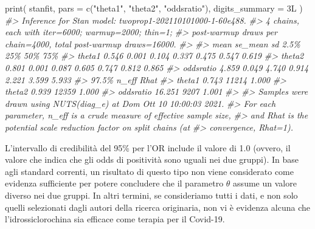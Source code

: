 \documentclass[
]{memoir}
\newenvironment{Shaded}{\begin{snugshade}}{\end{snugshade}}
\newcommand{\AttributeTok}[1]{\textcolor[rgb]{0.77,0.63,0.00}{#1}}
\newcommand{\CommentTok}[1]{\textcolor[rgb]{0.56,0.35,0.01}{\textit{#1}}}
\newcommand{\FunctionTok}[1]{\textcolor[rgb]{0.00,0.00,0.00}{#1}}
\newcommand{\NormalTok}[1]{#1}
\newcommand{\OtherTok}[1]{\textcolor[rgb]{0.56,0.35,0.01}{#1}}
\newcommand{\SpecialCharTok}[1]{\textcolor[rgb]{0.00,0.00,0.00}{#1}}
\newcommand{\StringTok}[1]{\textcolor[rgb]{0.31,0.60,0.02}{#1}}
\begin{document}
\begin{Shaded}
\end{Shaded}

\begin{Shaded}
\begin{Highlighting}[]
\FunctionTok{print}\NormalTok{(}
\NormalTok{  stanfit,}
  \AttributeTok{pars =} \FunctionTok{c}\NormalTok{(}\StringTok{"theta1"}\NormalTok{, }\StringTok{"theta2"}\NormalTok{, }\StringTok{"oddsratio"}\NormalTok{),}
  \AttributeTok{digits\_summary =}\NormalTok{ 3L}
\NormalTok{)}
\CommentTok{\#\textgreater{} Inference for Stan model: twoprop1{-}202110101000{-}1{-}60e488.}
\CommentTok{\#\textgreater{} 4 chains, each with iter=6000; warmup=2000; thin=1; }
\CommentTok{\#\textgreater{} post{-}warmup draws per chain=4000, total post{-}warmup draws=16000.}
\CommentTok{\#\textgreater{} }
\CommentTok{\#\textgreater{}            mean se\_mean    sd  2.5\%   25\%   50\%   75\%}
\CommentTok{\#\textgreater{} theta1    0.546   0.001 0.104 0.337 0.475 0.547 0.619}
\CommentTok{\#\textgreater{} theta2    0.801   0.001 0.087 0.605 0.747 0.812 0.865}
\CommentTok{\#\textgreater{} oddsratio 4.859   0.049 4.740 0.914 2.221 3.599 5.933}
\CommentTok{\#\textgreater{}            97.5\% n\_eff  Rhat}
\CommentTok{\#\textgreater{} theta1     0.743 11214 1.000}
\CommentTok{\#\textgreater{} theta2     0.939 12359 1.000}
\CommentTok{\#\textgreater{} oddsratio 16.251  9207 1.001}
\CommentTok{\#\textgreater{} }
\CommentTok{\#\textgreater{} Samples were drawn using NUTS(diag\_e) at Dom Ott 10 10:00:03 2021.}
\CommentTok{\#\textgreater{} For each parameter, n\_eff is a crude measure of effective sample size,}
\CommentTok{\#\textgreater{} and Rhat is the potential scale reduction factor on split chains (at }
\CommentTok{\#\textgreater{} convergence, Rhat=1).}
\end{Highlighting}
\end{Shaded}

L'intervallo di credibilità del 95\% per l'OR include il valore di 1.0 (ovvero, il valore che indica che gli odds di positività sono uguali nei due gruppi). In base agli standard correnti, un risultato di questo tipo non viene considerato come evidenza sufficiente per potere concludere che il parametro \(\theta\) assume un valore diverso nei due gruppi. In altri termini, se consideriamo tutti i dati, e non solo quelli selezionati dagli autori della ricerca originaria, non vi è evidenza alcuna che l'idrossiclorochina sia efficace come terapia per il Covid-19.
\end{document}
